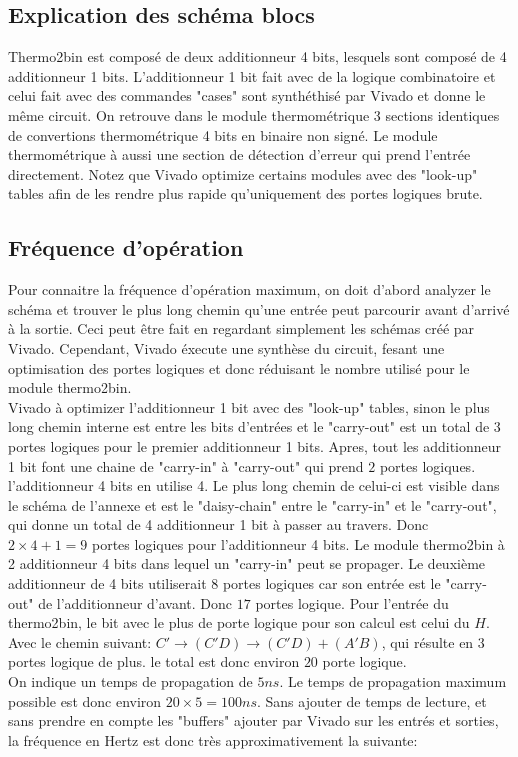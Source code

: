 \documentclass[a11paper]{article}
\begin{document}
\subsection{Explication des schéma blocs}
Thermo2bin est composé de deux additionneur 4 bits, lesquels sont composé de 4 additionneur 1 bits. L'additionneur 1 bit fait avec de la
logique combinatoire et celui fait avec des commandes "cases" sont synthéthisé par Vivado et donne le même circuit. On retrouve dans le
module thermométrique 3 sections identiques de convertions thermométrique 4 bits en binaire non signé. Le module thermométrique à aussi
une section de détection d'erreur qui prend l'entrée directement. Notez que Vivado optimize certains modules avec des "look-up" tables
afin de les rendre plus rapide qu'uniquement des portes logiques brute.

\subsection{Fréquence d'opération}
Pour connaitre la fréquence d'opération maximum, on doit d'abord analyzer le schéma et trouver le plus long chemin qu'une entrée peut
parcourir avant d'arrivé à la sortie. Ceci peut être fait en regardant simplement les schémas créé par Vivado. Cependant, Vivado éxecute
une synthèse du circuit, fesant une optimisation des portes logiques et donc réduisant le nombre utilisé pour le module thermo2bin. 
\\
Vivado à optimizer l'additionneur 1 bit avec des "look-up" tables, sinon le plus long chemin interne est entre les bits d'entrées et le
"carry-out" est un total de $3$ portes logiques pour le premier additionneur 1 bits. Apres, tout les additionneur 1 bit font une chaine 
de "carry-in" à "carry-out" qui prend $2$ portes logiques. l'additionneur 4 bits en utilise 4. Le plus long chemin de celui-ci est visible 
dans le schéma de l'annexe et est le "daisy-chain" entre le "carry-in" et le "carry-out", qui donne un total de 4 additionneur 1 bit à 
passer au travers. Donc $2\times4+1=9$ portes logiques pour l'additionneur 4 bits. Le module thermo2bin à 2 additionneur 4 bits dans lequel 
un "carry-in" peut se propager. Le deuxième additionneur de 4 bits utiliserait $8$ portes logiques car son entrée est le 
"carry-out" de l'additionneur d'avant. Donc $17$ portes logique. Pour l'entrée du thermo2bin, le bit avec le plus de porte logique pour son 
calcul est celui du $H$. Avec le chemin suivant: $C'\rightarrow(C'D)\rightarrow(C'D)+(A'B)$, qui résulte en $3$ portes logique 
de plus. le total est donc environ $20$ porte logique.
\\
On indique un temps de propagation de $5ns$. Le temps de propagation maximum possible est donc environ $20\times5=100ns$. Sans ajouter de
temps de lecture, et sans prendre en compte les "buffers" ajouter par Vivado sur les entrés et sorties, la fréquence en Hertz est donc 
très approximativement la suivante:
\end{document}
